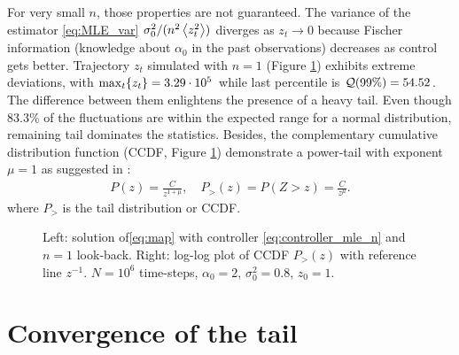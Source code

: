 \documentclass[FinalReport.tex]{subfiles}
\begin{document}
For very small $n$, those properties are not guaranteed. The variance of the estimator \eqref{eq:MLE_var} $\sigma_0^2/(n^2\expval{z_t^2})$ diverges as $z_t\rightarrow0$ because Fischer information (knowledge about $\alpha_0$ in the past observations) decreases as control gets better. 
Trajectory $z_t$ simulated with $n=1$ (Figure \ref{fig:dist_n=1}) exhibits extreme deviations, with $\max_{t}\{z_t\}=3.29\cdot10^{5}$ while last percentile is $\mathcal{Q}(99\%)=54.52$. The difference between them enlightens the presence of a heavy tail. Even though $83.3\%$ of the fluctuations are within the expected range for a normal distribution, remaining tail dominates the statistics.
 Besides, the complementary cumulative distribution function (CCDF, Figure \ref{fig:dist_n=1}) demonstrate a power-tail with exponent $\mu=1$ as suggested in \cite{OptCont, FrontNanoScience}:
\begin{align}\label{eq:pt}
	P(z)=\frac{C}{z^{1+\mu}}, \quad P_>(z)=P(Z>z)=\frac{C}{z^\mu}.
\end{align}
where $P_>$ is the tail distribution or CCDF.
\begin{figure}[h!]
	\centering
	\caption{Left: solution of\eqref{eq:map} with controller \eqref{eq:controller_mle_n} and $n=1$ look-back. Right: log-log plot of CCDF $P_>(z)$ with reference line $z^{-1}$. $N=10^6$ time-steps, $\alpha_0=2$, $\sigma_0^2=0.8$, $z_0=1$.}
	\label{fig:dist_n=1}
\end{figure}

\section{Convergence of the tail}
\end{document}
